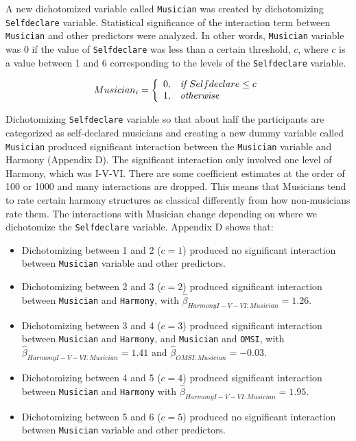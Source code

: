 \documentclass{article}
\begin{document}
A new dichotomized variable called \texttt{Musician} was created by dichotomizing \texttt{Selfdeclare} variable. Statistical significance of the interaction term between \texttt{Musician} and other predictors were analyzed. In other words, \texttt{Musician} variable was 0 if the value of \texttt{Selfdeclare} was less than a certain threshold, $c$, where $c$ is a value between 1 and 6 corresponding to the levels of the \texttt{Selfdeclare} variable.

\[
     Musician_i = \left\{\begin{array}{rl}
                  0, & \mbox{\it if $Selfdeclare\leq c$}\\
                  1, & \mbox{\it otherwise}
                  \end{array}\right.
\]

Dichotomizing \texttt{Selfdeclare} variable so that about half the participants are categorized as self-declared musicians and creating a new dummy variable called \texttt{Musician} produced significant interaction between the \texttt{Musician} variable and Harmony (Appendix D). The significant interaction only involved one level of Harmony, which was I-V-VI. There are some coefficient estimates at the order of 100 or 1000 and many interactions are dropped. This means that Musicians tend to rate certain harmony structures as classical differently from how non-musicians rate them. The interactions with Musician change depending on where we dichotomize the \texttt{Selfdeclare} variable. Appendix D shows that:

\begin{itemize}
    \item Dichotomizing between 1 and 2 ($c=1$) produced no significant interaction between \texttt{Musician} variable and other predictors.
    \item Dichotomizing between 2 and 3 ($c=2$) produced significant interaction between \texttt{Musician} and \texttt{Harmony}, with $\hat{\beta}_{HarmonyI-V-VI:Musician} = 1.26$.
    \item Dichotomizing between 3 and 4 ($c=3$) produced significant interaction between \texttt{Musician} and \texttt{Harmony}, and \texttt{Musician} and \texttt{OMSI}, with $\hat{\beta}_{HarmonyI-V-VI:Musician} = 1.41$ and $\hat{\beta}_{OMSI:Musician} = -0.03$.
    \item Dichotomizing between 4 and 5 ($c=4$) produced significant interaction between \texttt{Musician} and \texttt{Harmony} with $\hat{\beta}_{HarmonyI-V-VI:Musician} = 1.95$.
    \item Dichotomizing between 5 and 6 ($c=5$) produced no significant interaction between \texttt{Musician} variable and other predictors.
\end{itemize}
\end{document}
